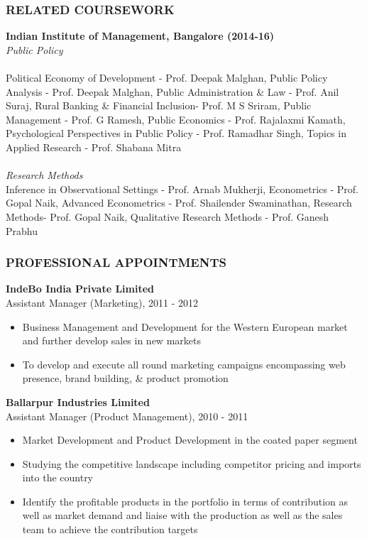 \documentclass[12pt, a4paper]{article}
\begin{document}
	\subsubsection*{RELATED COURSEWORK}
	\noindent\textbf{Indian Institute of Management, Bangalore (2014-16)} \\
	\noindent\textit{Public Policy} \\
	\\
	Political Economy of Development - Prof. Deepak Malghan, Public Policy Analysis - Prof. Deepak Malghan, Public Administration \& Law - Prof. Anil Suraj, Rural Banking \& Financial Inclusion- Prof. M S Sriram, Public Management - Prof. G Ramesh, Public Economics - Prof. Rajalaxmi Kamath, Psychological Perspectives in Public Policy - Prof. Ramadhar Singh, Topics in Applied Research - Prof. Shabana Mitra \\
	\\
	\noindent\textit{Research Methods} \\
	Inference in Observational Settings - Prof. Arnab Mukherji, Econometrics - Prof. Gopal Naik, Advanced Econometrics - Prof. Shailender Swaminathan, Research Methods- Prof. Gopal Naik, Qualitative Research Methods - Prof. Ganesh Prabhu
	\subsubsection*{PROFESSIONAL APPOINTMENTS}
	\noindent\textbf{IndeBo India Private Limited} \\
	Assistant Manager (Marketing), 2011 - 2012 
	\begin{itemize}
		\item Business Management and Development for the Western European market and further develop sales in new markets
		\item To develop and execute all round marketing campaigns encompassing web presence, brand building, \& product promotion
	\end{itemize}
	
	\noindent\textbf{Ballarpur Industries Limited} \\
	Assistant Manager (Product Management), 2010 - 2011
	\begin{itemize}
		\item Market Development and Product Development in the coated paper segment
		\item Studying the competitive landscape including competitor pricing and imports into the country
		\item Identify the profitable products in the portfolio in terms of contribution as well as market demand and liaise with the production as well as the sales team to achieve the contribution targets
	\end{itemize}
\end{document}
